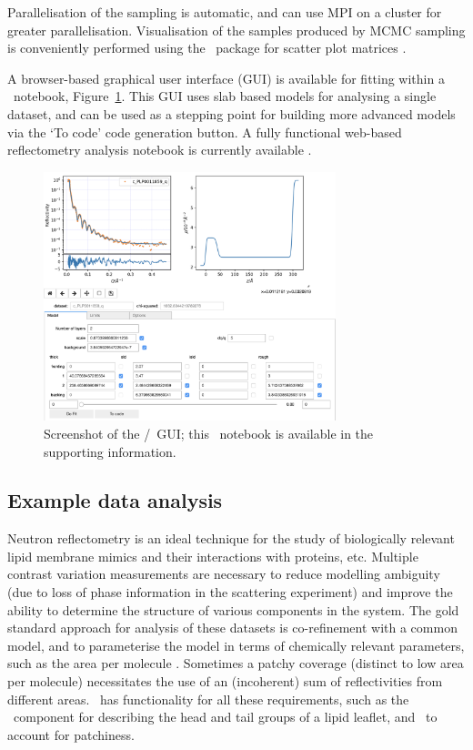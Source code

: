 \documentclass[pdf,preprint]{iucr}
\begin{document}
Parallelisation of the sampling is automatic, and can use MPI on a cluster for greater parallelisation. Visualisation of the samples produced by MCMC sampling is conveniently performed using the \corner\ package for scatter plot matrices \cite{corner}.

A browser-based graphical user interface (GUI) \cite{ipywidgets} is available for fitting within a \Jupyter\ notebook, Figure~\ref{fig:gui}. This GUI uses slab based models for analysing a single dataset, and can be used as a stepping point for building more advanced models via the `To code' code generation button. A fully functional web-based reflectometry analysis notebook is currently available \cite{Nelson2018}. 

\begin{figure}
  \includegraphics[width=85mm]{./supporting_information/gui.png}
  \caption{Screenshot of the \Jupyter/\ipywidgets\ GUI; this \Jupyter\ notebook is available in the supporting information.}
  \label{fig:gui}
\end{figure}

\subsection{Example data analysis}

Neutron reflectometry is an ideal technique for the study of biologically relevant lipid membrane mimics and their interactions with proteins, etc. Multiple contrast variation measurements are necessary to reduce modelling ambiguity (due to loss of phase information in the scattering experiment) and improve the ability to determine the structure of various components in the system. The gold standard approach for analysis of these datasets is co-refinement with a common model, and to parameterise the model in terms of chemically relevant parameters, such as the area per molecule \cite{campbell2018}. Sometimes a patchy coverage (distinct to low area per molecule) necessitates the use of an (incoherent) sum of reflectivities from different areas. \ has functionality for all these requirements, such as the \LipidLeaflet\ component for describing the head and tail groups of a lipid leaflet, and \MixedReflectModel\ to account for patchiness.
\end{document}
